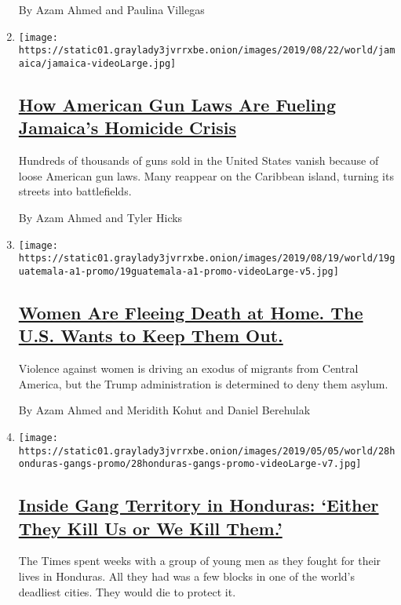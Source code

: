 \begin{enumerate}
  By Azam Ahmed and Paulina Villegas
\item
  \texttt{[image: https://static01.graylady3jvrrxbe.onion/images/2019/08/22/world/jamaica/jamaica-videoLarge.jpg]}

  \hypertarget{how-american-gun-laws-are-fueling-jamaicas-homicide-crisis}{%
  \subsection{\texorpdfstring{\href{/2019/08/25/world/americas/one-handgun-9-murders-how-american-firearms-cause-carnage-abroad.html}{How
  American Gun Laws Are Fueling Jamaica's Homicide
  Crisis}}{How American Gun Laws Are Fueling Jamaica's Homicide Crisis}}\label{how-american-gun-laws-are-fueling-jamaicas-homicide-crisis}}

  Hundreds of thousands of guns sold in the United States vanish because
  of loose American gun laws. Many reappear on the Caribbean island,
  turning its streets into battlefields.

  By Azam Ahmed and Tyler Hicks
\item
  \texttt{[image: https://static01.graylady3jvrrxbe.onion/images/2019/08/19/world/19guatemala-a1-promo/19guatemala-a1-promo-videoLarge-v5.jpg]}

  \hypertarget{women-are-fleeing-death-at-home-the-us-wants-to-keep-them-out}{%
  \subsection{\texorpdfstring{\href{/2019/08/18/world/americas/guatemala-violence-women-asylum.html}{Women
  Are Fleeing Death at Home. The U.S. Wants to Keep Them
  Out.}}{Women Are Fleeing Death at Home. The U.S. Wants to Keep Them Out.}}\label{women-are-fleeing-death-at-home-the-us-wants-to-keep-them-out}}

  Violence against women is driving an exodus of migrants from Central
  America, but the Trump administration is determined to deny them
  asylum.

  By Azam Ahmed and Meridith Kohut and Daniel Berehulak
\item
  \texttt{[image: https://static01.graylady3jvrrxbe.onion/images/2019/05/05/world/28honduras-gangs-promo/28honduras-gangs-promo-videoLarge-v7.jpg]}

  \hypertarget{inside-gang-territory-in-honduras-either-they-kill-us-or-we-kill-them}{%
  \subsection{\texorpdfstring{\href{/interactive/2019/05/04/world/americas/honduras-gang-violence.html}{Inside
  Gang Territory in Honduras: `Either They Kill Us or We Kill
  Them.'}}{Inside Gang Territory in Honduras: `Either They Kill Us or We Kill Them.'}}\label{inside-gang-territory-in-honduras-either-they-kill-us-or-we-kill-them}}

  The Times spent weeks with a group of young men as they fought for
  their lives in Honduras. All they had was a few blocks in one of the
  world's deadliest cities. They would die to protect it.
\end{enumerate}


